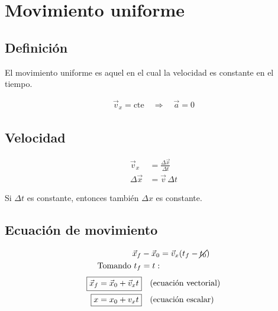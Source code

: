 \section{Movimiento uniforme}

\subsection{Definición}
El movimiento uniforme es aquel en el cual la velocidad es constante en el tiempo.
\vspace{-20pt}

\begin{align*}
\vec{v}_x = \text{cte} \quad \Rightarrow \quad \vec{a} = 0
\end{align*}

\vspace{-20pt}

\subsection{Velocidad}
\vspace{-20pt}

\begin{align*}
\vec{v}_x &= \frac{\Delta \vec{x}}{\Delta t} \\
\Delta \vec{x} &= \vec{v}\,\Delta t
\end{align*}

Si $\Delta t$ es constante, entonces también $\Delta x$ es constante.

\vspace{-10pt}

\subsection{Ecuación de movimiento}
\vspace{-30pt}

\begin{align*}
\vec{x}_f - \vec{x}_0 &= \vec{v}_x (t_f - \cancel{t_0}) \\
\text{Tomando } t_f = t: \\
\end{align*}
\vspace{-50pt}
\begin{align}
\Aboxed{\vec{x}_f &= \vec{x}_0 + \vec{v}_x t} \quad \text{(ecuación vectorial)} \\
\Aboxed{x &= x_0 + v_x t} \quad \text{(ecuación escalar)}
\end{align}

